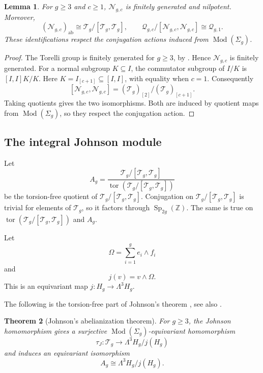 \documentclass[11pt,a4paper]{article}
\newtheorem{theorem}{Theorem}[section]
\newtheorem{lemma}[theorem]{Lemma}
\theoremstyle{definition}
\newcommand{\Z}{\mathbb Z}
\newcommand{\Mod}{\operatorname{Mod}}
\newcommand{\Sp}{\operatorname{Sp}}
\newcommand{\tor}{\operatorname{tor}}
\newcommand{\ab}{\mathrm{ab}}
\begin{document}
\begin{lemma}
\label{lem:nilab}
For \(g\ge3\) and \(c\ge1\), \(\mathcal{N}_{g,c}\) is finitely
generated and nilpotent. Moreover,
\[
 (\mathcal{N}_{g,c})_{\ab}\cong \mathcal{T}_g/[\mathcal{T}_g,\mathcal{T}_g],
 \qquad \mathcal{Q}_{g,c}/[\mathcal{N}_{g,c},\mathcal{N}_{g,c}]\cong \mathcal{Q}_{g,1}.
\]
These identifications respect the conjugation actions induced
from \(\Mod(\Sigma_g)\).
\end{lemma}
\begin{proof}
The Torelli group is finitely generated for \(g\ge3\), by
\cite{JohnsonI}. Hence \(\mathcal{N}_{g,c}\) is finitely generated.
For a normal subgroup \(K\subseteq I\), the commutator
subgroup of \(I/K\) is \([I,I]K/K\). Here
\(K=I_{[c+1]}\subseteq[I,I]\), with equality when
\(c=1\). Consequently
\[
 [\mathcal{N}_{g,c},\mathcal{N}_{g,c}]=(\mathcal{T}_g)_{[2]}/(\mathcal{T}_g)_{[c+1]}.
\]
Taking quotients gives the two isomorphisms. Both are induced by
quotient maps from \(\Mod(\Sigma_g)\), so they respect the conjugation action.
\end{proof}

\subsection{The integral Johnson module}

Let
\[
 A_g=\frac{\mathcal{T}_g/[\mathcal{T}_g,\mathcal{T}_g]}
 {\tor(\mathcal{T}_g/[\mathcal{T}_g,\mathcal{T}_g])}
\]
be the torsion-free quotient of \(\mathcal{T}_g/[\mathcal{T}_g,\mathcal{T}_g]\).
Conjugation on \(\mathcal{T}_g/[\mathcal{T}_g,\mathcal{T}_g]\) is trivial for elements of \(\mathcal{T}_g\),
so it factors through \(\Sp_{2g}(\Z)\). The same is true on
\(\tor(\mathcal{T}_g/[\mathcal{T}_g,\mathcal{T}_g])\) and \(A_g\).

Let \[\Omega=\sum_{i=1}^g e_i\wedge f_i\] and
\[j(v)=v\wedge\Omega.\] This is an equivariant map
\(j:H_g\to\Lambda^3 H_g\).


The following is the torsion-free part of Johnson's theorem
\cite{JohnsonIII}, see also \cite[p.~398 and Theorem~3.1]{DimcaPapadima}.
\begin{theorem}[Johnson's abelianization theorem]
\label{thm:johnsoninput}
For \(g\ge3\), the Johnson homomorphism gives a surjective
\(\Mod(\Sigma_g)\)-equivariant homomorphism
\[
 \tau_J:\mathcal{T}_g\longrightarrow\Lambda^3 H_g/j(H_g)
\]
and induces an equivariant isomorphism
\[
 A_g\cong\Lambda^3 H_g/j(H_g).
\]
\end{theorem}
\end{document}
